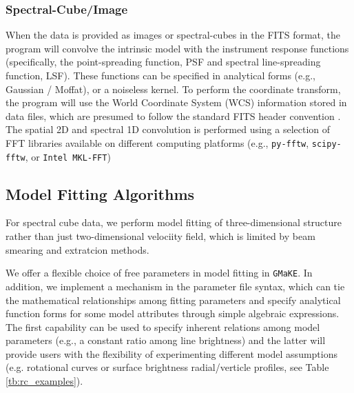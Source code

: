 \documentclass[twocolumn,tighten]{aastex62}
\newcommand{\gmake}{{\tt GMaKE}}
\newcommand{\pyfftw}{{\tt py-fftw}}
\newcommand{\scipyfftw}{{\tt scipy-fftw}}
\newcommand{\mklfft}{{\tt Intel MKL-FFT}}
\begin{document}
%

\subsubsection{Spectral-Cube/Image}

When the data is provided as images or spectral-cubes in the FITS format, the program will convolve the intrinsic model with the instrument response functions (specifically, the point-spreading function, PSF and spectral line-spreading function, LSF).
These functions can be specified in analytical forms (e.g., Gaussian / Moffat), or a noiseless kernel.
To perform the coordinate transform, the program will use the World Coordinate System (WCS) information stored in data files, which are presumed to follow the standard FITS header convention \citep{Greisen:2002aa}.
The spatial 2D and spectral 1D convolution is performed using a selection of FFT libraries available on different computing platforms (e.g., \pyfftw, \scipyfftw,  or \mklfft)

%


\subsection{Model Fitting Algorithms} \label{sec:fitting}

For spectral cube data, we perform model fitting of three-dimensional structure rather than just two-dimensional velociity field, which is limited by beam smearing and extratcion methods.

We offer a flexible choice of free parameters in model fitting in \gmake. In addition, we implement a mechanism in the parameter file syntax, which can tie the mathematical relationships among fitting parameters and specify analytical function forms for some model attributes through simple algebraic expressions.
The first capability can be used to specify inherent relations among model parameters (e.g., a constant ratio among line brightness) and the latter will provide users with the flexibility of experimenting different model assumptions (e.g. rotational curves or surface brightness radial/verticle profiles, see Table\,\ref{tb:rc_examples}).
\end{document}
